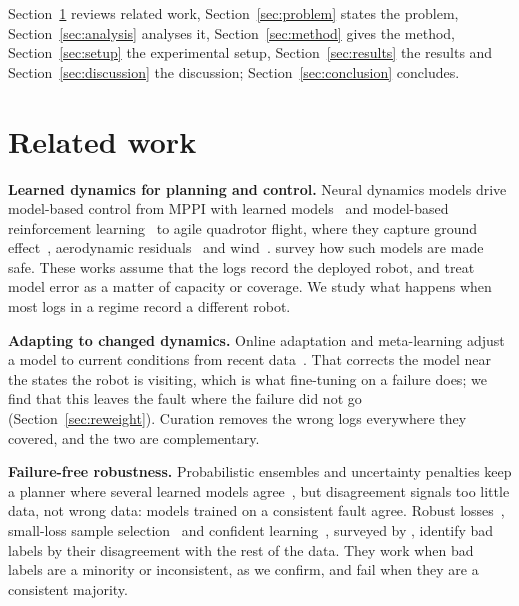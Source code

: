 \documentclass[preprint,12pt]{elsarticle}
\begin{document}
Section~\ref{sec:related} reviews related work, Section~\ref{sec:problem} states the problem, Section~\ref{sec:analysis} analyses it, Section~\ref{sec:method} gives the method, Section~\ref{sec:setup} the experimental setup, Section~\ref{sec:results} the results and Section~\ref{sec:discussion} the discussion; Section~\ref{sec:conclusion} concludes.

\section{Related work}\label{sec:related}

\textbf{Learned dynamics for planning and control.} Neural dynamics models drive model-based control from MPPI with learned models~\citep{williams2017itmpc} and model-based reinforcement learning~\citep{nagabandi2018neural,chua2018pets} to agile quadrotor flight, where they capture ground effect~\citep{shi2019neurallander}, aerodynamic residuals~\citep{torrente2021datadriven,bauersfeld2021neurobem,salzmann2023neuralmpc} and wind~\citep{oconnell2022neuralfly}. \citet{brunke2022safelearning} survey how such models are made safe. These works assume that the logs record the deployed robot, and treat model error as a matter of capacity or coverage. We study what happens when most logs in a regime record a different robot.

\textbf{Adapting to changed dynamics.} Online adaptation and meta-learning adjust a model to current conditions from recent data~\citep{nagabandi2019adapt,oconnell2022neuralfly}. That corrects the model near the states the robot is visiting, which is what fine-tuning on a failure does; we find that this leaves the fault where the failure did not go (Section~\ref{sec:reweight}). Curation removes the wrong logs everywhere they covered, and the two are complementary.

\textbf{Failure-free robustness.} Probabilistic ensembles and uncertainty penalties keep a planner where several learned models agree~\citep{chua2018pets,yu2020mopo}, but disagreement signals too little data, not wrong data: models trained on a consistent fault agree. Robust losses~\citep{huber1964robust}, small-loss sample selection~\citep{han2018coteaching} and confident learning~\citep{northcutt2021confident}, surveyed by \citet{song2023noisylabels}, identify bad labels by their disagreement with the rest of the data. They work when bad labels are a minority or inconsistent, as we confirm, and fail when they are a consistent majority.
\end{document}
